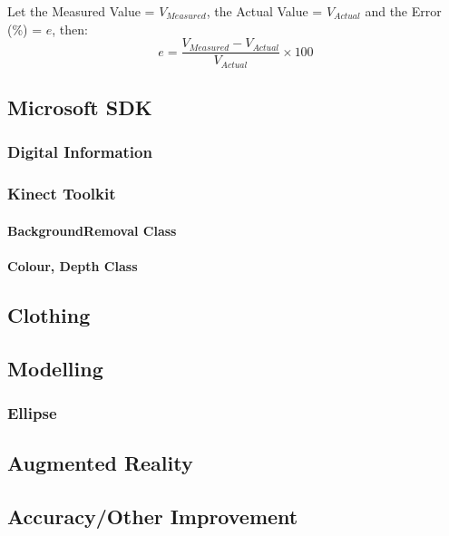 Let the Measured Value = $V_{Measured}$, the Actual Value = $V_{Actual}$ and the Error (\%) = $e$, then:\\
\begin{equation} \label{eq: measurementAcc}
e = \frac{V_{Measured} - V_{Actual}}{V_{Actual}} \times 100
\end{equation} 


\subsection{Microsoft SDK}

\subsubsection{Digital Information}

\subsubsection{Kinect Toolkit}

\paragraph{BackgroundRemoval Class}

\paragraph{Colour, Depth Class}


\subsection{Clothing}



\subsection{Modelling}

\subsubsection{Ellipse}




\subsection{Augmented Reality}


\subsection{Accuracy/Other Improvement }